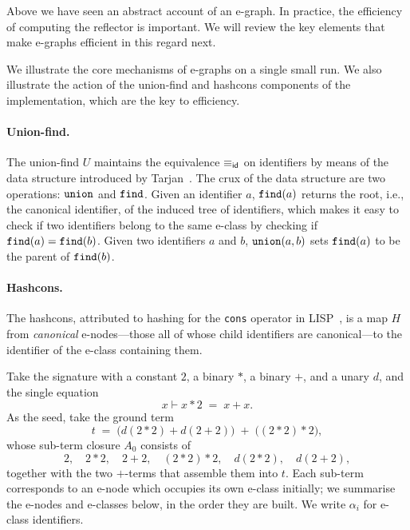 Above we have seen an abstract account of an e-graph.  In practice, the efficiency of computing the reflector is important.
We will review the key elements that make e-graphs efficient in this regard next.
\begin{example}
\label{ex:egraph-run}
We illustrate the core mechanisms of e-graphs on a single small run.
We also illustrate the action of the union-find and hashcons components of the implementation, which are the key to efficiency.
\paragraph{Union-find.} The union-find $U$ maintains the equivalence $\equiv_{\sf id}$ on identifiers by means of the data structure introduced by Tarjan~\cite{Tarjan}.
The crux of the data structure are two operations: $\texttt{union}$ and $\texttt{find}$.
Given an identifier $a$, $\texttt{find}(a)$ returns the root, i.e., the canonical identifier, of the induced tree of identifiers, which makes it easy to check if two identifiers belong to the same e-class by checking if $\texttt{find}(a) = \texttt{find}(b)$.
Given two identifiers $a$ and $b$, $\texttt{union}(a,b)$ sets $\texttt{find}(a)$ to be the parent of $\texttt{find}(b)$.
\paragraph{Hashcons.} The hashcons, attributed to hashing for the \texttt{cons} operator in LISP~\cite{hashconsing}, is a map $H$ from \emph{canonical} e-nodes---those all of whose child identifiers are canonical---to the identifier of the e-class containing them.

Take the signature with a constant
$2$, a binary $\ast$, a binary $+$, and a unary $d$, and the single
equation
\[
x \vdash x \ast 2 \;=\; x + x.
\]
As the seed, take the ground term
\[
t \;=\; \bigl(d(2 \ast 2) + d(2 + 2)\bigr) \;+\; \bigl((2 \ast 2) \ast 2\bigr),
\]
whose sub-term closure $A_0$ consists of
\[
2,\quad 2\ast 2,\quad 2+2,\quad (2\ast 2)\ast 2,\quad d(2\ast 2),\quad
d(2+2),
\]
together with the two $+$-terms that assemble them into $t$.
Each sub-term corresponds to an e-node which occupies its own e-class
initially; we summarise the e-nodes and e-classes below, in the order
they are built. We write $\alpha_i$ for e-class identifiers.


\end{example}
